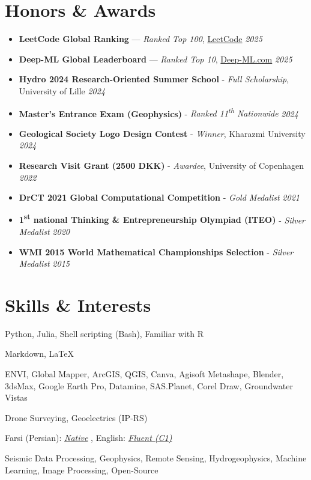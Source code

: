\documentclass[letterpaper,11pt]{article}
\begin{document}
\section{Honors \& Awards}
\begin{itemize}[left=0pt, label={}, topsep=7.5pt,partopsep=0pt,itemsep=3.5pt,parsep=0pt]
	\item \textbf{LeetCode Global Ranking} — \textit{Ranked Top 100}, \href{https://leetcode.com/u/aradfarahani/}{LeetCode} \hfill \textit{2025}
	\item \textbf{Deep-ML Global Leaderboard} — \textit{Ranked Top 10}, \href{https://www.deep-ml.com/leaderboard}{Deep-ML.com} \hfill \textit{2025}
	\item \textbf{Hydro 2024 Research-Oriented Summer School} - \textit{Full Scholarship}, University of Lille \hfill \textit{2024}
	\item \textbf{Master's Entrance Exam (Geophysics)} - \textit{Ranked 11\textsuperscript{th} Nationwide} \hfill \textit{2024}
	\item \textbf{Geological Society Logo Design Contest} - \textit{Winner}, Kharazmi University \hfill \textit{2024}
	\item \textbf{Research Visit Grant (2500 DKK)} - \textit{Awardee}, University of Copenhagen \hfill \textit{2022}
	\item \textbf{DrCT 2021 Global Computational Competition} - \textit{Gold Medalist} \hfill \textit{2021}
	\item \textbf{1\textsuperscript{st} national Thinking \& Entrepreneurship Olympiad (ITEO)} - \textit{Silver Medalist} \hfill \textit{2020}
	\item \textbf{WMI 2015 World Mathematical Championships Selection} - \textit{Silver Medalist} \hfill \textit{2015}	
\end{itemize}


\section{Skills \& Interests}
\begin{description}[itemsep=0pt]
	\item[Programming Language:] Python, Julia, Shell scripting (Bash), Familiar with R
	\item[Markup Language:] Markdown, \LaTeX
	\item[Software:] ENVI, Global Mapper, ArcGIS, QGIS, Canva, Agisoft Metashape, Blender, 3dsMax, Google Earth Pro, Datamine, SAS.Planet, Corel Draw, Groundwater Vistas
	\item[Fieldwork Skills:] Drone Surveying, Geoelectrics (IP-RS)
	\item[Language:] Farsi (Persian): \textit{\underline{Native}} , English: \textit{\underline{Fluent (C1)}}
	\item[Research Interests:] Seismic Data Processing, Geophysics, Remote Sensing, Hydrogeophysics, Machine Learning, Image Processing, Open-Source
\end{description}

\end{document}
